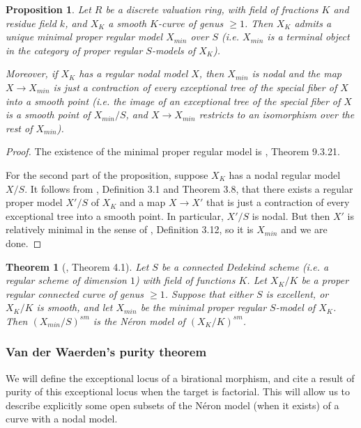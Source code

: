 \documentclass[a4paper,12pt]{amsart} %
\numberwithin{equation}{subsection}
\theoremstyle{definition}
\theoremstyle{plain}%
\newtheorem{proposition}[definition]{Proposition}
\newtheorem{theorem}[definition]{Theorem}
\theoremstyle{remark}
\begin{document}
\begin{proposition}\label{prop existence et forme du modele propre regulier minimal}
	Let $R$ be a discrete valuation ring, with field of fractions $K$ and residue field $k$, and $X_K$ a smooth $K$-curve of genus $\geq 1$. Then $X_K$ admits a unique minimal proper regular model $X_{min}$ over $S$ (i.e. $X_{min}$ is a terminal object in the category of proper regular $S$-models of $X_K$).
	
	Moreover, if $X_K$ has a regular nodal model $X$, then $X_{min}$ is nodal and the map $X\to X_{min}$ is just a contraction of every exceptional tree of the special fiber of $X$ into a smooth point (i.e. the image of an exceptional tree of the special fiber of $X$ is a smooth point of $X_{min}/S$, and $X\to X_{min}$ restricts to an isomorphism over the rest of $X_{min}$).
\end{proposition}

\begin{proof}
	The existence of the minimal proper regular model is \cite{Liu}, Theorem 9.3.21.
	
	For the second part of the proposition, suppose $X_K$ has a nodal regular model $X/S$. It follows from \cite{Liu}, Definition 3.1 and Theorem 3.8, that there exists a regular proper model $X'/S$ of $X_K$ and a map $X\to X'$ that is just a contraction of every exceptional tree into a smooth point. In particular, $X'/S$ is nodal. But then $X'$ is relatively minimal in the sense of \cite{Liu}, Definition 3.12, so it is $X_{min}$ and we are done.
\end{proof}

\begin{theorem}[\cite{LiuTong}, Theorem 4.1]\label{Theorem LiuTong}
Let $S$ be a connected Dedekind scheme (i.e. a regular scheme of dimension $1$) with field of functions $K$. Let $X_K/K$ be a proper regular connected curve of genus $\geq 1$. Suppose that either $S$ is excellent, or $X_K/K$ is smooth, and let $X_{min}$ be the minimal proper regular $S$-model of $X_K$. Then $(X_{min}/S)^{sm}$ is the N\'eron model of $(X_K/K)^{sm}$.
\end{theorem}

\subsubsection{Van der Waerden's purity theorem}

We will define the exceptional locus of a birational morphism, and cite a result of purity of this exceptional locus when the target is factorial. This will allow us to describe explicitly some open subsets of the N\'eron model (when it exists) of a curve with a nodal model.
\end{document}
